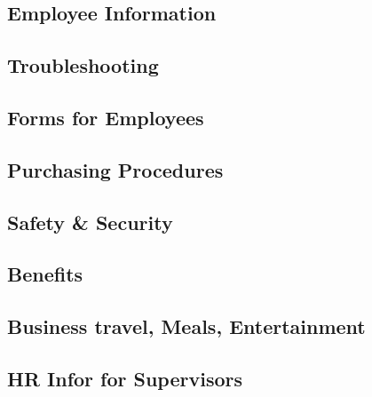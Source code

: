 \documentclass[11pt]{article}
\begin{document}
\subsection{Employee Information}
\label{sec:orgdea8d4d}

\subsection{Troubleshooting}
\label{sec:org5df822d}

\subsection{Forms for Employees}
\label{sec:orgbba8e0c}

\subsection{Purchasing Procedures}
\label{sec:orgf88d0f7}

\subsection{Safety \& Security}
\label{sec:org0565579}

\subsection{Benefits}
\label{sec:orgca0f20c}

\subsection{Business travel, Meals, Entertainment}
\label{sec:orgd655590}

\subsection{HR Infor for Supervisors}
\label{sec:org073af8b}
\end{document}

